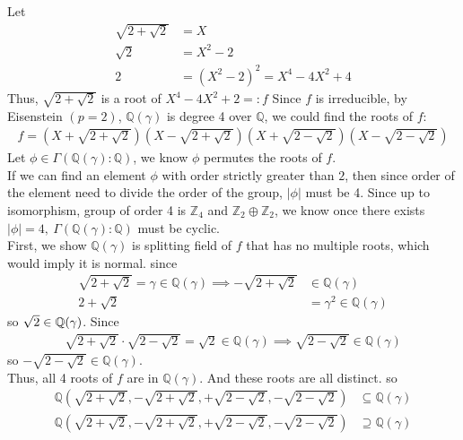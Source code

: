 \documentclass{article}
\begin{document}
\begin{homeworkProblem}
    Let 
    \begin{align}
        \sqrt{2 + \sqrt{2}} &= X \\
        \sqrt{2} &= X^2 - 2 \\
        2 &= (X^2 - 2)^2 = X^4 - 4 X^2 + 4
    \end{align}
    Thus, $\sqrt{2+\sqrt{2}}$ is a root of $X^4 - 4X^2 + 2 =: f$
    Since $f$ is irreducible, by Eisenstein $(p=2)$, 
    $\mathbb{Q}(\gamma)$ is degree 4 over $\mathbb{Q}$,
    we could find the roots of $f$:
    \begin{align}
        f = \left(X + \sqrt{2+\sqrt{2}}\right) \left(X - \sqrt{2+\sqrt{2}} \right) \left(X + \sqrt{2-\sqrt{2}}\right) \left(X - \sqrt{2-\sqrt{2}}\right)
    \end{align}
    Let $\phi \in \Gamma(\mathbb{Q}(\gamma):\mathbb{Q})$, we know $\phi$ permutes the roots of $f$.\\
    If we can find an element $\phi$ with order strictly greater than $2$, 
    then since order of the element need to divide the order of the group,
    $\lvert \phi \rvert$ must be 4. Since up to isomorphism, group of order 4
    is $\mathbb{Z}_4$ and $\mathbb{Z}_2 \oplus \mathbb{Z}_2$, we know once 
    there exists $\lvert \phi \rvert = 4, \ \Gamma(\mathbb{Q}(\gamma):\mathbb{Q})$ must be cyclic.\\
    First, we show $ \mathbb{Q}(\gamma) $ is splitting field of $f$
    that has no multiple roots, which would imply it is normal.
    since 
    \begin{align}
        \sqrt{2+\sqrt{2}} = \gamma \in \mathbb{Q}(\gamma) \implies - \sqrt{2+\sqrt{2}} &\in \mathbb{Q}(\gamma)\\
        2+\sqrt{2} &= \gamma^2 \in \mathbb{Q}(\gamma) 
    \end{align}
    so $\sqrt{2} \in \mathbb{Q}(\gamma)$. Since
    \begin{align}
        \sqrt{2+\sqrt{2}} \cdot \sqrt{2 - \sqrt{2}} = \sqrt{2} \in \mathbb{Q}(\gamma) \implies \sqrt{2-\sqrt{2}} \in \mathbb{Q}(\gamma)  
    \end{align}
    so $-\sqrt{2-\sqrt{2}} \in \mathbb{Q}(\gamma)$.\\
    Thus, all 4 roots of $f$ are in $\mathbb{Q}(\gamma)$. And 
    these roots are all distinct. so
    \begin{align}
        \mathbb{Q} \left(\sqrt{2+\sqrt{2}}, -\sqrt{2+\sqrt{2}}, +\sqrt{2-\sqrt{2}}, - \sqrt{2-\sqrt{2}}\right) &\subseteq \mathbb{Q}(\gamma)\\
        \mathbb{Q} \left(\sqrt{2+\sqrt{2}}, -\sqrt{2+\sqrt{2}}, +\sqrt{2-\sqrt{2}}, - \sqrt{2-\sqrt{2}}\right) &\supseteq \mathbb{Q}(\gamma)\\

\end{align}
\end{homeworkProblem}
\end{document}
